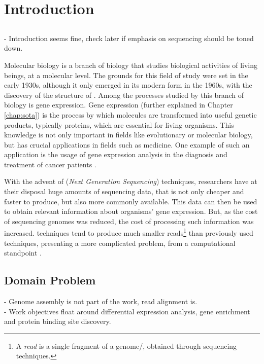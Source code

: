 \chapter{Introduction} \label{chap:intro}

\section*{}

\begin{Notes}
- Introduction seems fine, check later if emphasis on sequencing should be toned
down.
\end{Notes}

Molecular biology is a branch of biology that studies biological activities of
living beings, at a molecular level. The grounds for this field of study were
set in the early 1930s, although it only emerged in its modern form in the
1960s, with the discovery of the structure of \dna. Among the processes studied
by this branch of biology is gene expression. Gene expression (further explained
in Chapter \ref{chap:sota}) is the process by which \dna{} molecules are
transformed into useful genetic products, typically proteins, which are
essential for living organisms. This knowledge is not only important in fields
like evolutionary or molecular biology, but has crucial applications in fields
such as medicine. One example of such an application is the usage of gene
expression analysis in the diagnosis and treatment of cancer patients
\cite{Pusztai01062003}.

With the advent of \ngs{} (\textit{Next Generation Sequencing}) techniques,
researchers have at their disposal huge amounts of sequencing data, that is not
only cheaper and faster to produce, but also more commonly available. This data
can then be used to obtain relevant information about organisms' gene
expression. But, as the cost of sequencing genomes was reduced, the cost of
processing such information was increased. \ngs{} techniques tend to produce
much smaller reads\footnote{A \textit{read} is a single fragment of a
genome/\trans, obtained through sequencing techniques.} than previously used
techniques, presenting a more complicated problem, from a computational
standpoint \cite{Wolf2013}.

\section{Domain Problem} \label{sec:problem}

\begin{Notes}
- Genome assembly is not part of the work, read alignment is.\\
- Work objectives float around differential expression analysis, gene enrichment
and protein binding site discovery.\\
\end{Notes}

